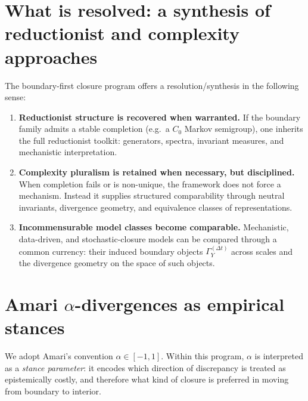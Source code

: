 \documentclass[11pt]{article}
\begin{document}
\section{What is resolved: a synthesis of reductionist and complexity approaches}
The boundary-first closure program offers a resolution/synthesis in the following sense:

\begin{enumerate}[leftmargin=1.8em]
\item \textbf{Reductionist structure is recovered when warranted.}
If the boundary family admits a stable completion (e.g.\ a $C_0$ Markov semigroup), one inherits the
full reductionist toolkit: generators, spectra, invariant measures, and mechanistic interpretation.

\item \textbf{Complexity pluralism is retained when necessary, but disciplined.}
When completion fails or is non-unique, the framework does not force a mechanism. Instead it supplies
structured comparability through neutral invariants, divergence geometry, and equivalence classes of
representations.

\item \textbf{Incommensurable model classes become comparable.}
Mechanistic, data-driven, and stochastic-closure models can be compared through a common currency:
their induced boundary objects $\Gamma_Y^{(\Delta t)}$ across scales and the divergence geometry on
the space of such objects.
\end{enumerate}

\section{Amari $\alpha$-divergences as empirical stances}
We adopt Amari's convention $\alpha\in[-1,1]$. Within this program, $\alpha$ is interpreted as a
\emph{stance parameter}: it encodes which direction of discrepancy is treated as epistemically costly,
and therefore what kind of closure is preferred in moving from boundary to interior.
\end{document}

